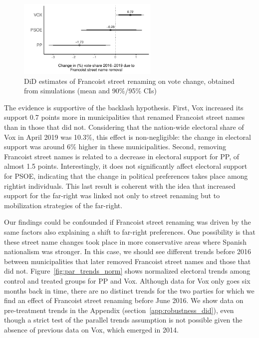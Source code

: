 \documentclass[12pt, titlepage]{article}
\begin{document}
\begin{figure}[htb!]
\centering

    \vspace{25pt}

  \includegraphics[width = 0.6\textwidth]{img/DiD_estimates}

  \caption{DiD estimates of Francoist street renaming on vote change, obtained from simulations (mean and 90\%/95\% CIs)}\label{fig:main_did}

\end{figure}

The evidence is supportive of the backlash hypothesis. First, Vox increased its support 0.7 points more in municipalities that renamed Francoist street names than in those that did not. Considering that the nation-wide electoral share of Vox in April 2019 was 10.3\%, this effect is non-negligible: the change in electoral support was around 6\% higher in these municipalities.
Second, removing Francoist street names is related to a decrease in electoral support for PP, of almost 1.5 points. Interestingly, it does not significantly affect electoral support for PSOE, indicating that the change in political preferences takes place among rightist individuals. This last result is coherent with the idea that increased support for the far-right was linked not only to street renaming but to mobilization strategies of the far-right.

Our findings could be confounded if Francoist street renaming was driven by the same factors also explaining a shift to far-right preferences.
One possibility is that these street name changes took place in more conservative areas where Spanish nationalism was stronger.
In this case, we should see different trends before 2016 between municipalities that later removed Francoist street names and those that did not.
Figure~\ref{fig:par_trends_norm} shows normalized electoral trends among control and treated groups for PP and Vox.
Although data for Vox only goes six months back in time, there are no distinct trends for the two parties for which we find an effect of Francoist street renaming before June 2016.
We show data on pre-treatment trends in the Appendix (section~\ref{app:robustness_did}), even though a strict test of the parallel trends assumption is not possible given the absence of previous data on Vox, which emerged in 2014.
\end{document}
